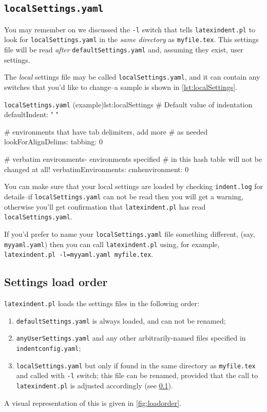 \documentclass[11pt]{article}
\begin{document}
\subsection{\lstinline!localSettings.yaml!}\label{sec:localsettings}
You may remember on  we discussed the \lstinline!-l! switch
that tells \lstinline!latexindent.pl! to look for \lstinline!localSettings.yaml! in the
\emph{same directory} as \lstinline!myfile.tex!. This settings file will
be read \emph{after} \lstinline!defaultSettings.yaml! and, assuming they exist,
user settings.

The \emph{local} settings file may be called \lstinline!localSettings.yaml!, and
it can contain any switches that you'd
like to change--a sample is shown in \cref{lst:localSettings}.

\begin{cmhlistings}[style=yaml]{\lstinline!localSettings.yaml! (example)}{lst:localSettings}
# Default value of indentation
defaultIndent: " "

# environments that have tab delimiters, add more
# as needed
lookForAlignDelims:
   tabbing: 0

#  verbatim environments- environments specified
#  in this hash table will not be changed at all!
verbatimEnvironments:
    cmhenvironment: 0
\end{cmhlistings}

You can make sure that your local settings are loaded by checking \lstinline!indent.log!
for details--if \lstinline!localSettings.yaml! can not be read then you will
get a warning, otherwise you'll get confirmation that
\lstinline!latexindent.pl! has read \lstinline!localSettings.yaml!.

If you'd prefer to name your \lstinline!localSettings.yaml! file something different, (say, \lstinline!myyaml.yaml!) then
you can call \lstinline!latexindent.pl! using, for example, \lstinline[breaklines=true]!latexindent.pl -l=myyaml.yaml myfile.tex!.

\subsection{Settings load order}\label{sec:loadorder}
\lstinline!latexindent.pl! loads the settings files in the following order:
\begin{enumerate}
	\item \lstinline!defaultSettings.yaml! is always loaded, and can not be renamed;
	\item \lstinline!anyUserSettings.yaml! and any other arbitrarily-named files specified in \lstinline!indentconfig.yaml!;
	\item \lstinline!localSettings.yaml! but only if found in the same directory as \lstinline!myfile.tex! and called
	      with \lstinline!-l! switch; this file can be renamed, provided that the call to \lstinline!latexindent.pl! is adjusted 
          accordingly (see \cref{sec:localsettings}).
\end{enumerate}
A visual representation of this is given in \cref{fig:loadorder}.
\end{document}
